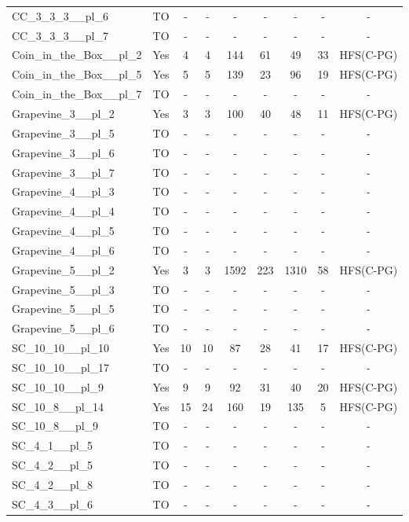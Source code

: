 \documentclass{article}
\begin{document}
\begin{tabular}{lcccccccc}
CC\_3\_3\_3\_\_pl\_6 & TO & - & - & - & - & - & - & - \\
CC\_3\_3\_3\_\_pl\_7 & TO & - & - & - & - & - & - & - \\
Coin\_in\_the\_Box\_\_pl\_2 & Yes & 4 & 4 & 144 & 61 & 49 & 33 & HFS(C-PG) \\
Coin\_in\_the\_Box\_\_pl\_5 & Yes & 5 & 5 & 139 & 23 & 96 & 19 & HFS(C-PG) \\
Coin\_in\_the\_Box\_\_pl\_7 & TO & - & - & - & - & - & - & - \\
Grapevine\_3\_\_pl\_2 & Yes & 3 & 3 & 100 & 40 & 48 & 11 & HFS(C-PG) \\
Grapevine\_3\_\_pl\_5 & TO & - & - & - & - & - & - & - \\
Grapevine\_3\_\_pl\_6 & TO & - & - & - & - & - & - & - \\
Grapevine\_3\_\_pl\_7 & TO & - & - & - & - & - & - & - \\
Grapevine\_4\_\_pl\_3 & TO & - & - & - & - & - & - & - \\
Grapevine\_4\_\_pl\_4 & TO & - & - & - & - & - & - & - \\
Grapevine\_4\_\_pl\_5 & TO & - & - & - & - & - & - & - \\
Grapevine\_4\_\_pl\_6 & TO & - & - & - & - & - & - & - \\
Grapevine\_5\_\_pl\_2 & Yes & 3 & 3 & 1592 & 223 & 1310 & 58 & HFS(C-PG) \\
Grapevine\_5\_\_pl\_3 & TO & - & - & - & - & - & - & - \\
Grapevine\_5\_\_pl\_5 & TO & - & - & - & - & - & - & - \\
Grapevine\_5\_\_pl\_6 & TO & - & - & - & - & - & - & - \\
SC\_10\_10\_\_pl\_10 & Yes & 10 & 10 & 87 & 28 & 41 & 17 & HFS(C-PG) \\
SC\_10\_10\_\_pl\_17 & TO & - & - & - & - & - & - & - \\
SC\_10\_10\_\_pl\_9 & Yes & 9 & 9 & 92 & 31 & 40 & 20 & HFS(C-PG) \\
SC\_10\_8\_\_pl\_14 & Yes & 15 & 24 & 160 & 19 & 135 & 5 & HFS(C-PG) \\
SC\_10\_8\_\_pl\_9 & TO & - & - & - & - & - & - & - \\
SC\_4\_1\_\_pl\_5 & TO & - & - & - & - & - & - & - \\
SC\_4\_2\_\_pl\_5 & TO & - & - & - & - & - & - & - \\
SC\_4\_2\_\_pl\_8 & TO & - & - & - & - & - & - & - \\
SC\_4\_3\_\_pl\_6 & TO & - & - & - & - & - & - & - \\

\end{tabular}
\end{document}
